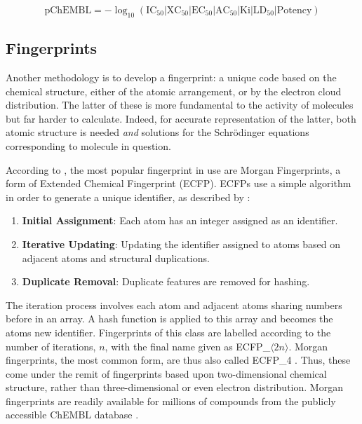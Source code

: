 \begin{equation}
  \label{eq:pChEMBL}
  \mathrm{pChEMBL}=-\log_{10}{\left(\mathrm{IC_{50}}|\mathrm{XC_{50}}|\mathrm{EC_{50}}|\mathrm{AC_{50}}|\mathrm{Ki}|\mathrm{LD_{50}}|\mathrm{Potency}\right)}
\end{equation}

\subsection{Fingerprints}
Another methodology is to develop a fingerprint: a unique code based on the chemical structure, either of the atomic arrangement, or by the electron cloud distribution. The latter of these is more fundamental to the activity of molecules but far harder to calculate. Indeed, for accurate representation of the latter, both atomic structure is needed \textit{and} solutions for the Schrödinger equations corresponding to molecule in question.

According to \textcite{Cap20}, the most popular fingerprint in use are Morgan Fingerprints, a form of Extended Chemical Fingerprint (ECFP). ECFPs use a simple algorithm in order to generate a unique identifier, as described by \textcite{Mor2020}:

\begin{enumerate}
  \item \textbf{Initial Assignment}: Each atom has an integer assigned as an identifier.
  \item \textbf{Iterative Updating}: Updating the identifier assigned to atoms based on adjacent atoms and structural duplications.
  \item \textbf{Duplicate Removal}: Duplicate features are removed for hashing.
\end{enumerate}

The iteration process involves each atom and adjacent atoms sharing numbers before in an array. A hash function is applied to this array and becomes the atoms new identifier. Fingerprints of this class are labelled according to the number of iterations, $n$, with the final name given as ECFP\_$\langle{}2n\rangle{}$. Morgan fingerprints, the most common form, are thus also called ECFP\_4 \cite{Cap20, Mor2020}. Thus, these come under the remit of fingerprints based upon two-dimensional chemical structure, rather than three-dimensional or even electron distribution. Morgan fingerprints are readily available for millions of compounds from the publicly accessible ChEMBL database \cite{CHEMBL}.

